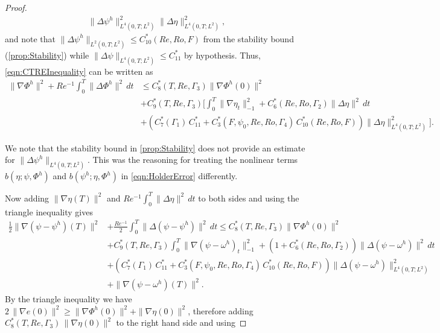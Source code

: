 \begin{proof}
\begin{align}
      \|\Delta \psi^h\|^2_{L^4(0,T;L^2)} \|\Delta \eta\|^2_{L^4(0,T;L^2)},
    \label{eqn:HolderPsi}
  \end{align}
  and note that $\|\Delta \psi^h\|_{L^2(0,T;L^2)}\le C^*_{10}(Re,Ro,F)$ from the
  stability bound (\autoref{prop:Stability}) while $\|\Delta
  \psi\|_{L^4(0,T;L^2)}\le C^*_{11}$ by hypothesis. Thus, \eqref{eqn:CTREInequality}
  can be written as
  \begin{align*}
    \|\nabla \Phi^h\|^2 + Re^{-1} \int_0^T\! \|\Delta \Phi^h\|^2\, dt
      & \le C^*_8(T,Re,\Gamma_3) \|\nabla \Phi^h(0)\|^2 \\
    & + C^*_9(T,Re,\Gamma_3)\biggl[ \int_0^T\! \|\nabla \eta_t\|_{-1}^2
      + C^*_6(Re,Ro,\Gamma_2) \|\Delta \eta\|^2\, dt \\
    & +\left(C^*_7(\Gamma_1)\,C^*_{11}
      + C^*_3(F,\psi_0,Re,Ro,\Gamma_4)\,C^*_{10}(Re,Ro,F)\right)
      \|\Delta \eta\|^2_{L^4(0,T;L^2)}\biggr].
  \end{align*}
  \begin{remark}
    We note that the stability bound in \autoref{prop:Stability} does not
    provide an estimate for $\|\Delta \psi^h\|_{L^4(0,T;L^2)}$. This was the
    reasoning for treating the nonlinear terms $b(\eta;\psi,\Phi^h)$ and
    $b(\psi^h;\eta,\Phi^h)$ in \eqref{eqn:HolderError} differently.
  \end{remark}
  Now adding $\|\nabla \eta(T)\|^2$ and $Re^{-1} \int_0^T\! \|\Delta \eta\|^2\,
  dt$ to both sides and using the triangle inequality gives
  \begin{align*}
    \frac{1}{2} \|\nabla \left( \psi - \psi^h\right)(T) \|^2
    &+ \frac{Re^{-1}}{2} \int_0^T\! \|\Delta \left(\psi - \psi^h\right)\|^2\, dt
      \le C^*_8(T,Re,\Gamma_3) \|\nabla \Phi^h(0)\|^2 \\
    & + C^*_9(T,Re,\Gamma_3) \int_0^T\! \|\nabla \left( \psi - \omega^h\right)_t\|_{-1}^2
      + \left(1 + C^*_6(Re,Ro,\Gamma_2)\right)
      \|\Delta \left(\psi - \omega^h\right)\|^2\, dt \\
    & + \left(C^*_7(\Gamma_1)\, C^*_{11}
      + C^*_3(F,\psi_0,Re,Ro,\Gamma_4)\,C^*_{10}(Re,Ro,F)\right)
      \|\Delta \left(\psi - \omega^h\right)\|^2_{L^4(0,T;L^2)} \\
    & + \|\nabla \left(\psi - \omega^h\right)(T)\|^2.
  \end{align*}
  By the triangle inequality we have $2\, \|\nabla e(0)\|^2 \ge \|\nabla
  \Phi^h(0)\|^2 + \|\nabla \eta(0)\|^2$, therefore adding
  $C_8^*(T,Re,\Gamma_3)\,\|\nabla \eta(0)\|^2$ to the right hand side and using

\end{proof}
